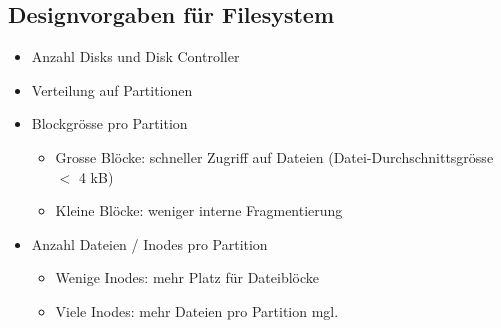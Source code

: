 \documentclass[a4paper, 10pt]{article}
\begin{document}
\subsection{Designvorgaben für Filesystem}
\begin{itemize}
\item Anzahl Disks und Disk Controller
\item Verteilung auf Partitionen
\item Blockgrösse pro Partition
\begin{itemize}
\item Grosse Blöcke: schneller Zugriff auf Dateien (Datei-Durchschnittsgrösse $<$ 4 kB)
\item Kleine Blöcke: weniger interne Fragmentierung
\end{itemize} 
\item Anzahl Dateien / Inodes pro Partition
\begin{itemize}
\item Wenige Inodes: mehr Platz für Dateiblöcke
\item Viele Inodes: mehr Dateien pro Partition mgl.
\end{itemize} 
\end{itemize}





  		
\end{document}
